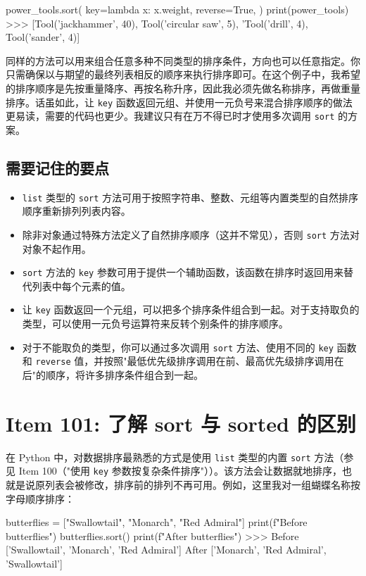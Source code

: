 \begin{codebox}[python]
power_tools.sort(
    key=lambda x: x.weight,
    reverse=True,
)
print(power_tools)
>>>
[Tool('jackhammer', 40), Tool('circular saw', 5),
'Tool('drill', 4), Tool('sander', 4)]
\end{codebox}

同样的方法可以用来组合任意多种不同类型的排序条件，方向也可以任意指定。你只需确保以与期望的最终列表相反的顺序来执行排序即可。在这个例子中，我希望的排序顺序是先按重量降序、再按名称升序，因此我必须先做名称排序，再做重量排序。话虽如此，让 \texttt{key} 函数返回元组、并使用一元负号来混合排序顺序的做法更易读，需要的代码也更少。我建议只有在万不得已时才使用多次调用 \texttt{sort} 的方案。

\subsection{需要记住的要点}

\begin{itemize}
\item \texttt{list} 类型的 \texttt{sort} 方法可用于按照字符串、整数、元组等内置类型的自然排序顺序重新排列列表内容。
\item 除非对象通过特殊方法定义了自然排序顺序（这并不常见），否则 \texttt{sort} 方法对对象不起作用。
\item \texttt{sort} 方法的 \texttt{key} 参数可用于提供一个辅助函数，该函数在排序时返回用来替代列表中每个元素的值。
\item 让 \texttt{key} 函数返回一个元组，可以把多个排序条件组合到一起。对于支持取负的类型，可以使用一元负号运算符来反转个别条件的排序顺序。
\item 对于不能取负的类型，你可以通过多次调用 \texttt{sort} 方法、使用不同的 \texttt{key} 函数和 \texttt{reverse} 值，并按照"最低优先级排序调用在前、最高优先级排序调用在后"的顺序，将许多排序条件组合到一起。
\end{itemize}

\section{Item 101: 了解 sort 与 sorted 的区别}

在 Python 中，对数据排序最熟悉的方式是使用 \texttt{list} 类型的内置 \texttt{sort} 方法（参见 Item 100（"使用 \texttt{key} 参数按复杂条件排序"））。该方法会让数据就地排序，也就是说原列表会被修改，排序前的排列不再可用。例如，这里我对一组蝴蝶名称按字母顺序排序：

\begin{codebox}[python]
butterflies = ["Swallowtail", "Monarch", "Red Admiral"]
print(f"Before {butterflies}")
butterflies.sort()
print(f"After {butterflies}")
>>>
Before ['Swallowtail', 'Monarch', 'Red Admiral']
After ['Monarch', 'Red Admiral', 'Swallowtail']
\end{codebox}

